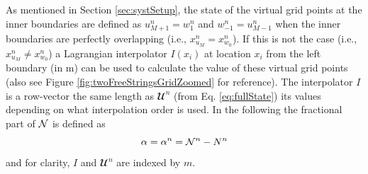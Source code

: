 As mentioned in Section \ref{sec:systSetup}, the state of the virtual grid points at the inner boundaries are defined as $u_{M+1}^n = w_1^n$ and $w_{-1}^n = u_{M-1}^n$ when the inner boundaries are perfectly overlapping  (i.e., $x^n_{u_M} = x^n_{w_0}$). If this is not the case (i.e., $x^n_{u_M} \neq x^n_{w_0}$) a Lagrangian interpolator $I(x_i)$ at location $x_i$ from the left boundary (in m) can be used to calculate the value of these virtual grid points (also see Figure \ref{fig:twoFreeStringsGridZoomed} for reference). The interpolator $I$ is a row-vector the same length as $\mathbfcal{U}^n$ (from Eq. \eqref{eq:fullState}) its values depending on what interpolation order is used. In the following the fractional part of $\mathcal{N}$ %
is defined as 
\begin{equation}\label{eq:alphaDef}
    \alpha = \alpha^n = \Nfrac^n - N^n %
\end{equation}
and for clarity, $I$ and $\mathbfcal{U}^n$ are indexed by $m$.
